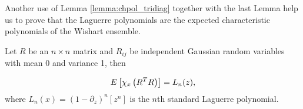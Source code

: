     Another use of Lemma \ref{lemma:chpol_tridiag} together with the last Lemma help us to prove that the Laguerre polynomials are the expected characteristic polynomials of the Wishart ensemble.


\begin{theorem}
    Let $R$ be an $n\times n$ matrix and $R_{ij}$ be independent Gaussian random variables with mean 0 and variance 1, then

    \begin{equation*}
        E\left[ \chi_x\left(R^TR\right) \right] = L_n(z),
    \end{equation*}
    \noindent where $L_n(x) = \left( 1 - \partial_z \right)^n [z^n]$ is the $n$th standard Laguerre polynomial.
\end{theorem}

